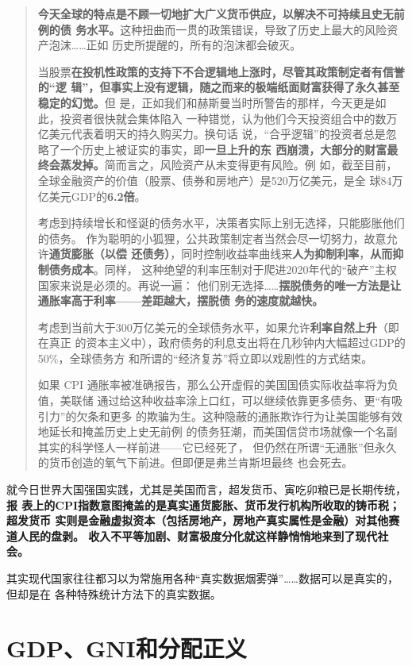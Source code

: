 \begin{quotation}
  \textbf{今天全球的特点是不顾一切地扩大广义货币供应，以解决不可持续且史无前例的债
    务水平。}这种扭曲而一贯的政策错误，导致了历史上最大的风险资产泡沫……正如
  历史所提醒的，所有的泡沫都会破灭。

  当股票\textbf{在投机性政策的支持下不合逻辑地上涨时，尽管其政策制定者有信誉的“逻
    辑”，但事实上没有逻辑，随之而来的极端纸面财富获得了永久甚至稳定的幻觉。}但
  是，正如我们和赫斯曼当时所警告的那样，今天更是如此，投资者很快就会集体陷入
  一种错觉，认为他们今天投资组合中的数万亿美元代表着明天的持久购买力。换句话
  说，“合乎逻辑”的投资者总是忽略了一个历史上被证实的事实，即\textbf{一旦上升的东
    西崩溃，大部分的财富最终会蒸发掉。}简而言之，风险资产从未变得更有风险。例
  如，截至目前，全球金融资产的价值（股票、债券和房地产）是520万亿美元，是全
  球84万亿美元GDP的\textbf{6.2倍}。

  考虑到持续增长和怪诞的债务水平，决策者实际上别无选择，只能膨胀他们的债务。
  作为聪明的小狐狸，公共政策制定者当然会尽一切努力，故意允许\textbf{通货膨胀（以偿
    还债务）}，同时控制收益率曲线来\textbf{人为抑制利率}，\textbf{从而抑制债务成本}。同样，
  这种绝望的利率压制对于爬进2020年代的“破产”主权国家来说是必须的。再说一遍：
  他们别无选择……\textbf{摆脱债务的唯一方法是让通胀率高于利率——差距越大，摆脱债
    务的速度就越快。}

  考虑到当前大于300万亿美元的全球债务水平，如果允许\textbf{利率自然上升}（即在真正
  的资本主义中），政府债务的利息支出将在几秒钟内大幅超过GDP的50\%，全球债务方
  和所谓的“经济复苏”将立即以戏剧性的方式结束。

  如果 CPI 通胀率被准确报告，那么公开虚假的美国国债实际收益率将为负值，美联储
  通过给这种收益率涂上口红，可以继续依靠更多债务、更“有吸引力”的欠条和更多
  的欺骗为生。这种隐蔽的通胀欺诈行为让美国能够有效地延长和掩盖历史上史无前例
  的债务狂潮，而美国信贷市场就像一个名副其实的科学怪人一样前进——它已经死了，
  但仍然在所谓“无通胀”但永久的货币创造的氧气下前进。但即便是弗兰肯斯坦最终
  也会死去。
\end{quotation}

就今日世界大国强国实践，尤其是美国而言，超发货币、寅吃卯粮已是长期传统，\textbf{报
  表上的CPI指数意图掩盖的是真实通货膨胀、货币发行机构所收取的铸币税；超发货币
  实则是金融虚拟资本（包括房地产，房地产真实属性是金融）对其他赛道人民的盘剥。
  收入不平等加剧、财富极度分化就这样静悄悄地来到了现代社会。}

其实现代国家往往都习以为常施用各种“真实数据烟雾弹”……数据可以是真实的，但却是在
各种特殊统计方法下的真实数据。


\section{GDP、GNI和分配正义}

